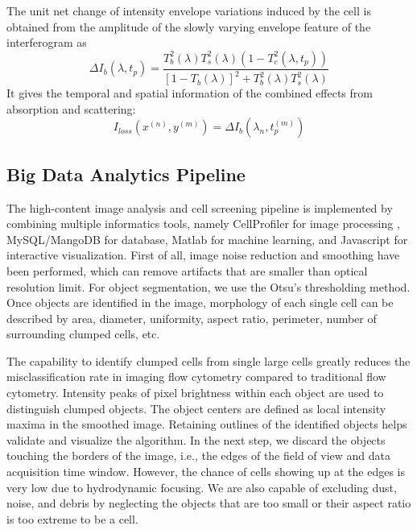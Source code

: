 \documentclass[aps,pra,reprint,superscriptaddress]{revtex4-1}
\begin{document}
The unit net change of intensity envelope variations induced by the cell is obtained from the amplitude of the slowly varying envelope feature of the interferogram as
\begin{equation}
\Delta I_b(\lambda, t_p) = \frac{T_b^2(\lambda) T_s^2(\lambda) (1 - T_c^2(\lambda, t_p))}{[1-T_b(\lambda)]^2 + T_b^2(\lambda) T_s^2(\lambda)}
\end{equation}
It gives the temporal and spatial information of the combined effects from absorption and scattering:
\begin{equation}
I_{loss}(x^{(n)}, y^{(m)}) = \Delta I_b(\lambda_n, t_p^{(m)})
\end{equation}

\subsection*{Big Data Analytics Pipeline}

The high-content image analysis and cell screening pipeline is implemented by combining multiple informatics tools, namely CellProfiler for image processing \cite{carpenter2006cellprofiler,kamentsky2011improved}, MySQL/MangoDB for database, Matlab for machine learning, and Javascript for interactive visualization. First of all, image noise reduction and smoothing have been performed, which can remove artifacts that are smaller than optical resolution limit. For object segmentation, we use the Otsu's thresholding method. Once objects are identified in the image, morphology of each single cell can be described by area, diameter, uniformity, aspect ratio, perimeter, number of surrounding clumped cells, etc.

The capability to identify clumped cells from single large cells greatly reduces the misclassification rate in imaging flow cytometry compared to traditional flow cytometry. Intensity peaks of pixel brightness within each object are used to distinguish clumped objects. The object centers are defined as local intensity maxima in the smoothed image. Retaining outlines of the identified objects helps validate and visualize the algorithm. In the next step, we discard the objects touching the borders of the image, i.e., the edges of the field of view and data acquisition time window. However, the chance of cells showing up at the edges is very low due to hydrodynamic focusing. We are also capable of excluding dust, noise, and debris by neglecting the objects that are too small or their aspect ratio is too extreme to be a cell.
\end{document}

